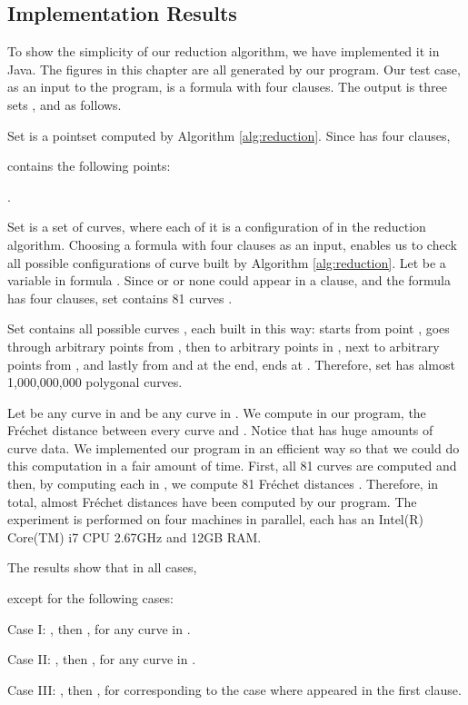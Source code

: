 \documentclass[12pt]{dalthesis}
\newcommand{\Frechet}{Fr\'echet }
\begin{document}
\subsection{Implementation Results}
To show the simplicity of our reduction algorithm, we have implemented it
in Java.  The figures in this chapter are all generated by our program. 
Our test case, as 
an input to the program, is a formula  with four clauses. The output is 
three sets ,  and  as follows.

Set  is a pointset computed by 
Algorithm \ref{alg:reduction}.
Since  has four clauses, 

contains the following points:

.


Set  is a set of curves, 
where each of it is a configuration of 
 in the reduction algorithm.
Choosing  a formula with four clauses as an input, 
enables us to check all possible configurations of curve  built by Algorithm \ref{alg:reduction}. 
Let   be a variable in  formula
.
Since  or  or none could appear in a clause, and the formula has four clauses,  set  contains 81 curves . 

Set  contains all possible curves , 
each built in this way: 
 starts from point , 
goes through arbitrary points from , 
then to arbitrary points in , next
to arbitrary points from , and lastly 
from 
and at the end, 
 ends at .
Therefore, set  has almost 1,000,000,000 polygonal curves.


Let  be any curve in  
and  be any curve in . 
We compute in our program, the \Frechet distance between every curve  and .
Notice that  has huge amounts of curve data. We implemented our 
program in an efficient way so 
that we could do this computation in 
a fair amount of time. First, 
all 81 curves  are computed and then, 
by computing each  in , 
we compute 81 \Frechet distances 
. Therefore, in total, 
almost  
\Frechet distances have been computed by our program. 
The experiment is 
performed on four machines in parallel, each 
has an Intel(R) Core(TM) i7 CPU 2.67GHz and 12GB RAM.


  
The results show that in all cases,
 
except for the following cases:
\vspace{0.1 in}

Case I:  , then 
, for any curve  in . 


Case II:  , then 
, for any curve  in .
 
Case III:  , then 
, for  corresponding to the case 
where  appeared in the 
first clause. 
\end{document}
